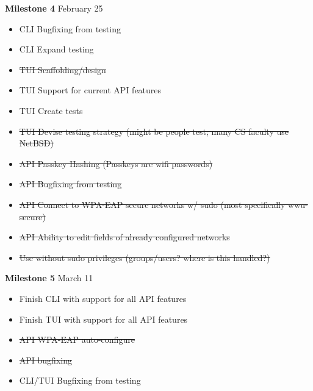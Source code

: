 \documentclass[11pt]{article}
\begin{document}
\textbf{Milestone 4} February 25
\begin{itemize}
  \item CLI Bugfixing from testing
  \item CLI Expand testing
  \item \sout{TUI Scaffolding/design}
  \item TUI Support for current API features
  \item TUI Create tests
  \item \sout{TUI Devise testing strategy (might be people test; many CS faculty use NetBSD)}
  \item\sout{API Passkey Hashing (Passkeys are wifi passwords)}
  \item\sout{API Bugfixing from testing}
  \item\sout{API Connect to WPA-EAP secure networks w/ sudo (most specifically wwu-secure)}
  \item\sout{API Ability to edit fields of already configured networks}
  \item\sout{Use without sudo privileges (groups/users? where is this handled?)}
\end{itemize}

\textbf{Milestone 5} March 11
\begin{itemize}
  \item Finish CLI with support for all API features
  \item Finish TUI with support for all API features
  \item\sout{API WPA-EAP auto-configure}
  \item\sout{API bugfixing}
  \item CLI/TUI Bugfixing from testing
\end{itemize}
\end{document}
